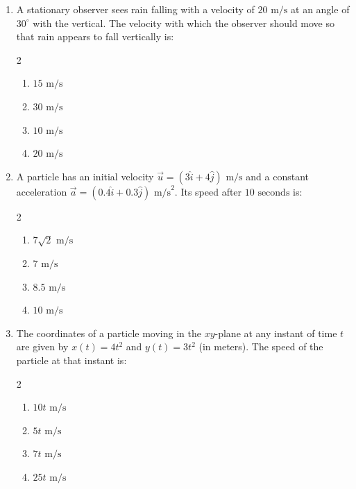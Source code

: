 \documentclass[11pt,a4paper]{article}
\begin{document}
\begin{enumerate}[label=\textbf{\textcolor{l2Amber}{Q\arabic*.}},leftmargin=24pt,itemsep=10pt,start=26]
  \item A stationary observer sees rain falling with a velocity of $20\text{ m/s}$ at an angle of $30^\circ$ with the vertical. The velocity with which the observer should move so that rain appears to fall vertically is:
  \begin{multicols}{2}
  \begin{enumerate}[label=\textbf{\textcolor{primaryDark}{(\Alph*)}},itemsep=2pt]
    \item $15\text{ m/s}$
    \item $30\text{ m/s}$
    \item $10\text{ m/s}$
    \item $20\text{ m/s}$
  \end{enumerate}
  \end{multicols}

  \item A particle has an initial velocity $\vec{u} = (3\hat{i} + 4\hat{j})\text{ m/s}$ and a constant acceleration $\vec{a} = (0.4\hat{i} + 0.3\hat{j})\text{ m/s}^2$. Its speed after $10\text{ seconds}$ is:
  \begin{multicols}{2}
  \begin{enumerate}[label=\textbf{\textcolor{primaryDark}{(\Alph*)}},itemsep=2pt]
    \item $7\sqrt{2}\text{ m/s}$
    \item $7\text{ m/s}$
    \item $8.5\text{ m/s}$
    \item $10\text{ m/s}$
  \end{enumerate}
  \end{multicols}

  \item The coordinates of a particle moving in the $xy$-plane at any instant of time $t$ are given by $x(t) = 4t^2$ and $y(t) = 3t^2$ (in meters). The speed of the particle at that instant is:
  \begin{multicols}{2}
  \begin{enumerate}[label=\textbf{\textcolor{primaryDark}{(\Alph*)}},itemsep=2pt]
    \item $10t\text{ m/s}$
    \item $5t\text{ m/s}$
    \item $7t\text{ m/s}$
    \item $25t\text{ m/s}$
  \end{enumerate}
  \end{multicols}


\end{enumerate}
\end{document}
